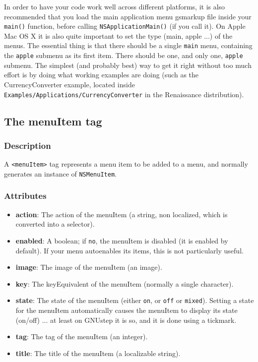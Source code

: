 In order to have your code work well across different platforms, it is
also recommended that you load the main application menu gsmarkup file
inside your \texttt{main()} function, before calling
\texttt{NSApplicationMain()} (if you call it).  On Apple Mac OS X it is
also quite important to set the type (main, apple ...)  of the menus.
The essential thing is that there should be a single \texttt{main}
menu, containing the \texttt{apple} submenu as its first item.  There
should be one, and only one, \texttt{apple} submenu.  The simplest
(and probably best) way to get it right without too much effort is by
doing what working examples are doing (such as the CurrencyConverter
example, located inside
\texttt{Examples/Applications/CurrencyConverter} in the Renaissance
distribution).

\subsection{The menuItem tag}

\subsubsection{Description}
A \texttt{<menuItem>} tag represents a menu item to be added to a menu,
and normally generates an instance of \texttt{NSMenuItem}.

\subsubsection{Attributes}
\begin{itemize}
\item {\bf action}: The action of the menuItem (a string, non localized, 
which is converted into a selector).
\item {\bf enabled}: A boolean; if \texttt{no}, the menuItem is disabled (it
is enabled by default).  If your menu autoenables its items, this is not
particularly useful.
\item {\bf image}: The image of the menuItem (an image).
\item {\bf key}: The keyEquivalent of the menuItem (normally a single character).
\item {\bf state}: The state of the menuItem (either \texttt{on}, or \texttt{off} 
or \texttt{mixed}).  Setting a state for the menuItem automatically
causes the menuItem to display its state (on/off) ... at least on
GNUstep it is so, and it is done using a tickmark.
\item {\bf tag}: The tag of the menuItem (an integer).
\item {\bf title}: The title of the menuItem (a localizable string).
\end{itemize}

